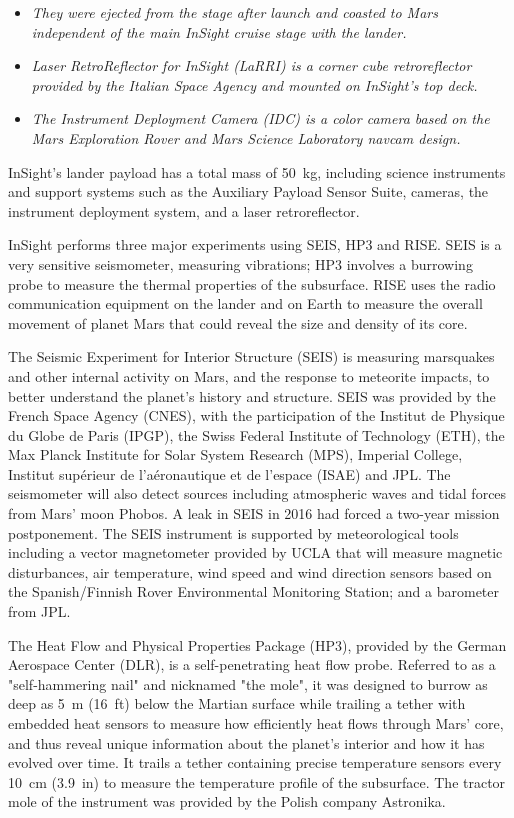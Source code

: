 \begin{itemize}
\item
  \emph{They were ejected from the stage after launch and coasted to
  Mars independent of the main InSight cruise stage with the lander.}
\item
  \emph{Laser RetroReflector for InSight (LaRRI) is a corner cube
  retroreflector provided by the Italian Space Agency and mounted on
  InSight's top deck.}
\item
  \emph{The Instrument Deployment Camera (IDC) is a color camera based
  on the Mars Exploration Rover and Mars Science Laboratory navcam
  design.}
\end{itemize}

InSight's lander payload has a total mass of 50~kg, including science
instruments and support systems such as the Auxiliary Payload Sensor
Suite, cameras, the instrument deployment system, and a laser
retroreflector.

InSight performs three major experiments using SEIS, HP3 and RISE. SEIS
is a very sensitive seismometer, measuring vibrations; HP3 involves a
burrowing probe to measure the thermal properties of the subsurface.
RISE uses the radio communication equipment on the lander and on Earth
to measure the overall movement of planet Mars that could reveal the
size and density of its core.

The Seismic Experiment for Interior Structure (SEIS) is measuring
marsquakes and other internal activity on Mars, and the response to
meteorite impacts, to better understand the planet's history and
structure. SEIS was provided by the French Space Agency (CNES), with the
participation of the Institut de Physique du Globe de Paris (IPGP), the
Swiss Federal Institute of Technology (ETH), the Max Planck Institute
for Solar System Research (MPS), Imperial College, Institut supérieur de
l'aéronautique et de l'espace (ISAE) and JPL. The seismometer will also
detect sources including atmospheric waves and tidal forces from Mars'
moon Phobos. A leak in SEIS in 2016 had forced a two-year mission
postponement. The SEIS instrument is supported by meteorological tools
including a vector magnetometer provided by UCLA that will measure
magnetic disturbances, air temperature, wind speed and wind direction
sensors based on the Spanish/Finnish Rover Environmental Monitoring
Station; and a barometer from JPL.

The Heat Flow and Physical Properties Package (HP3), provided by the
German Aerospace Center (DLR), is a self-penetrating heat flow probe.
Referred to as a "self-hammering nail" and nicknamed "the mole", it was
designed to burrow as deep as 5~m (16~ft) below the Martian surface
while trailing a tether with embedded heat sensors to measure how
efficiently heat flows through Mars' core, and thus reveal unique
information about the planet's interior and how it has evolved over
time. It trails a tether containing precise temperature sensors every
10~cm (3.9~in) to measure the temperature profile of the subsurface. The
tractor mole of the instrument was provided by the Polish company
Astronika.


